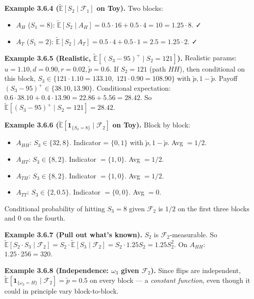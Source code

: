 \documentclass[
  10pt,
  twoside]{book}
\providecommand{\tightlist}{%
  \setlength{\itemsep}{0pt}\setlength{\parskip}{0pt}}
\begin{document}
\textbf{Example 3.6.4 (\(\tilde{\mathbb E}[S_2 \mid \mathcal F_1]\) on
Toy).} Two blocks:

\begin{itemize}
\tightlist
\item
  \(A_H\) (\(S_1 = 8\)):
  \(\tilde{\mathbb E}[S_2 \mid A_H] = 0.5 \cdot 16 + 0.5 \cdot 4 = 10 = 1.25 \cdot 8\).
  ✓
\item
  \(A_T\) (\(S_1 = 2\)):
  \(\tilde{\mathbb E}[S_2 \mid A_T] = 0.5 \cdot 4 + 0.5 \cdot 1 = 2.5 = 1.25 \cdot 2\).
  ✓
\end{itemize}

\textbf{Example 3.6.5 (Realistic,
\(\tilde{\mathbb E}[(S_3 - 95)^+ \mid S_2 = 121]\)).} Realistic params:
\(u=1.10, d=0.90, r=0.02, \tilde p = 0.6\). If \(S_2 = 121\) (path
\(HH\)), then conditional on this block,
\(S_3 \in \{121 \cdot 1.10 = 133.10,\; 121 \cdot 0.90 = 108.90\}\) with
\(\tilde p, 1-\tilde p\). Payoff \((S_3 - 95)^+ \in \{38.10, 13.90\}\).
Conditional expectation:
\(0.6 \cdot 38.10 + 0.4 \cdot 13.90 = 22.86 + 5.56 = 28.42\). So
\(\tilde{\mathbb E}[(S_3 - 95)^+ \mid S_2 = 121] = 28.42\).

\textbf{Example 3.6.6
(\(\tilde{\mathbb E}[\mathbf 1_{\{S_3 = 8\}} \mid \mathcal F_2]\) on
Toy).} Block by block:

\begin{itemize}
\tightlist
\item
  \(A_{HH}\): \(S_3 \in \{32, 8\}\). Indicator = \(\{0,1\}\) with
  \(\tilde p, 1-\tilde p\). Avg \(= 1/2\).
\item
  \(A_{HT}\): \(S_3 \in \{8, 2\}\). Indicator \(= \{1, 0\}\). Avg
  \(= 1/2\).
\item
  \(A_{TH}\): \(S_3 \in \{8, 2\}\). Indicator \(= \{1, 0\}\). Avg
  \(= 1/2\).
\item
  \(A_{TT}\): \(S_3 \in \{2, 0.5\}\). Indicator \(= \{0, 0\}\). Avg
  \(= 0\).
\end{itemize}

Conditional probability of hitting \(S_3 = 8\) given \(\mathcal F_2\) is
\(1/2\) on the first three blocks and \(0\) on the fourth.

\textbf{Example 3.6.7 (Pull out what's known).} \(S_2\) is
\(\mathcal F_2\)-measurable. So
\(\tilde{\mathbb E}[S_2 \cdot S_3 \mid \mathcal F_2] = S_2 \cdot \tilde{\mathbb E}[S_3 \mid \mathcal F_2] = S_2 \cdot 1.25 S_2 = 1.25 S_2^2\).
On \(A_{HH}\): \(1.25 \cdot 256 = 320\).

\textbf{Example 3.6.8 (Independence: \(\omega_3\) given
\(\mathcal F_2\)).} Since flips are independent,
\(\tilde{\mathbb E}[\mathbf 1_{\{\omega_3 = H\}} \mid \mathcal F_2] = \tilde p = 0.5\)
on every block --- a \emph{constant function}, even though it could in
principle vary block-to-block.
\end{document}
